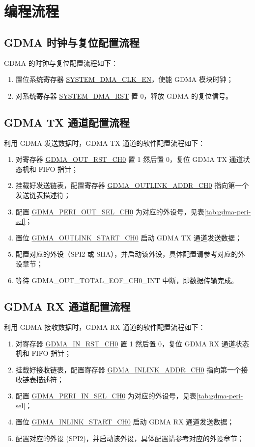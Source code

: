 \documentclass[main\_\_CN.tex]{subfiles}
\begin{document}
\section{编程流程}

\subsection{GDMA 时钟与复位配置流程}
GDMA 的时钟与复位配置流程如下：
\begin{enumerate}
    \item 置位系统寄存器 \hyperref[fielddesc:SYSTEMDMACLKEN]{SYSTEM\_DMA\_CLK\_EN}，使能 GDMA 模块时钟；
    \item 对系统寄存器 \hyperref[fielddesc:SYSTEMDMARST]{SYSTEM\_DMA\_RST} 置 0，释放 GDMA 的复位信号。
\end{enumerate}

\subsection{GDMA TX 通道配置流程}\label{tx-program}
利用 GDMA 发送数据时，GDMA TX 通道的软件配置流程如下：
\begin{enumerate}
    \item 对寄存器 \hyperref[fielddesc:GDMAOUTRSTCH0]{GDMA\_OUT\_RST\_CH0} 置 1 然后置 0，复位 GDMA TX 通道状态机和 FIFO 指针；
    \item 挂载好发送链表，配置寄存器 \hyperref[fielddesc:GDMAOUTLINKADDRCH0]{GDMA\_OUTLINK\_ADDR\_CH0} 指向第一个发送链表描述符；
    \item 配置 \hyperref[fielddesc:GDMAPERIOUTSELCH0]{GDMA\_PERI\_OUT\_SEL\_CH0} 为对应的外设号，见表\ref{tab:gdma-peri-sel}；
    \item 置位 \hyperref[fielddesc:GDMAOUTLINKSTARTCH0]{GDMA\_OUTLINK\_START\_CH0} 启动 GDMA TX 通道发送数据；
    \item 配置对应的外设（SPI2 或 SHA），并启动该外设，具体配置请参考对应的外设章节；
    \item 等待 GDMA\_OUT\_TOTAL\_EOF\_CH0\_INT 中断，即数据传输完成。
\end{enumerate}

\subsection{GDMA RX 通道配置流程}\label{rx-program}
利用 GDMA 接收数据时，GDMA RX 通道的软件配置流程如下：
\begin{enumerate}
    \item 对寄存器 \hyperref[fielddesc:GDMAINRSTCH0]{GDMA\_IN\_RST\_CH0} 置 1 然后置 0，复位 GDMA RX 通道状态机和 FIFO 指针；
    \item 挂载好接收链表，配置寄存器 \hyperref[fielddesc:GDMAINLINKADDRCH0]{GDMA\_INLINK\_ADDR\_CH0} 指向第一个接收链表描述符；
    \item 配置 \hyperref[fielddesc:GDMAPERIINSELCH0]{GDMA\_PERI\_IN\_SEL\_CH0} 为对应的外设号，见表\ref{tab:gdma-peri-sel}；
    \item 置位 \hyperref[fielddesc:GDMAINLINKSTARTCH0]{GDMA\_INLINK\_START\_CH0} 启动 GDMA RX 通道发送数据；
    \item 配置对应的外设 (SPI2)，并启动该外设，具体配置请参考对应的外设章节；
\end{enumerate}
\end{document}
